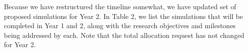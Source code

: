 \documentclass[11pt,letterpaper,english]{article}
\begin{document}

Because we have restructured the timeline somewhat, we have updated set of proposed simulations for Year 2. In Table 2, we list the simulations that will be completed in Year 1 and 2, along with the research objectives and milestones being addressed by each. Note that the total allocation request has not changed for Year 2.
\end{document}

